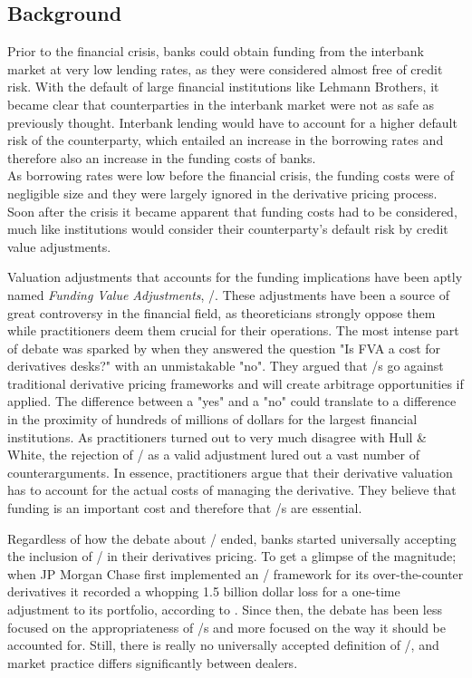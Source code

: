 \documentclass[main.tex]{subfiles}
\begin{document}
    \subsection{Background}
        
    Prior to the financial crisis, banks could obtain funding from the interbank market
    at very low lending rates, as they were considered almost free of credit risk.
    With the default of large financial institutions like Lehmann Brothers, 
    it became clear that counterparties in the interbank market 
    were not as safe as previously thought.
    Interbank lending would have to account for a higher default risk of the counterparty,
    which entailed an increase in the borrowing rates 
    and therefore also an increase in the funding costs of banks.
    \\
    As borrowing rates were low before the financial crisis, 
    the funding costs were of negligible size 
    and they were largely ignored in the derivative pricing process.
    Soon after the crisis it became apparent that funding costs had to be considered,
    much like institutions would consider their counterparty's default risk by 
    credit value adjustments.

    Valuation adjustments that accounts for the funding implications 
    have been aptly named \textit{Funding Value Adjustments}, \FVA/.
    These adjustments have been a source of great controversy in the financial field,
    as theoreticians strongly oppose them while practitioners deem them crucial for their operations.
    The most intense part of debate was sparked by \textcite{HullWhite2012FVA}
    when they answered the question "Is FVA a cost for derivatives desks?" 
    with an unmistakable "no".
    They argued that \FVA/s go against traditional derivative pricing frameworks
    and will create arbitrage opportunities if applied.
    The difference between a "yes" and a "no" could translate to a difference 
    in the proximity of hundreds of millions of dollars for the largest financial institutions.
    As practitioners turned out to very much disagree with Hull \& White,
    the rejection of \FVA/ as a valid adjustment lured out a vast number of counterarguments.
    In essence, practitioners argue that their derivative valuation 
    has to account for the actual costs of managing the derivative.
    They believe that funding is an important cost and therefore that \FVA/s are essential.

    Regardless of how the debate about \FVA/ ended, banks started universally accepting the inclusion of \FVA/
    in their derivatives pricing.
    To get a glimpse of the magnitude; when JP Morgan Chase first implemented an \FVA/ framework
    for its over-the-counter derivatives it recorded a whopping 1.5 billion dollar loss
    for a one-time adjustment to its portfolio, according to \textcite{JPMorganEarnings}.
    Since then, the debate has been less focused on the appropriateness of \FVA/s
    and more focused on the way it should be accounted for.
    Still, there is really no universally accepted definition of \FVA/,
    and market practice differs significantly between dealers.
\end{document}
